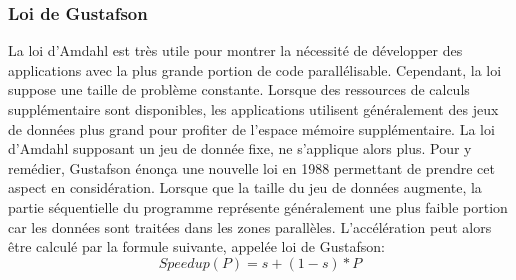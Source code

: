     
    \subsubsection{Loi de Gustafson} 
        
        La loi d'Amdahl est très utile pour montrer la nécessité de développer des applications avec la plus grande portion de code parallélisable. Cependant, la loi suppose une taille de problème constante. Lorsque des ressources de calculs supplémentaire sont disponibles, les applications utilisent généralement des jeux de données plus grand pour profiter de l'espace mémoire supplémentaire. La loi d'Amdahl supposant un jeu de donnée fixe, ne s'applique alors plus. Pour y remédier, Gustafson énonça une nouvelle loi en 1988 \cite{Gustafson1988} permettant de prendre cet aspect en considération.  Lorsque que la taille du jeu de données augmente, la partie séquentielle du programme représente généralement une plus faible portion car les données sont traitées dans les zones parallèles. L'accélération peut alors être calculé par la formule suivante, appelée loi de Gustafson:
        \begin{equation}
        Speedup (P) = s + (1-s) * P
        \end{equation}
        
        
        













